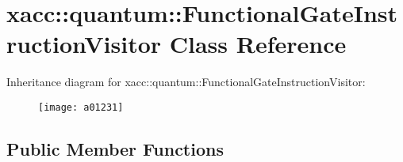 \hypertarget{a01231}{}\section{xacc\+:\+:quantum\+:\+:Functional\+Gate\+Instruction\+Visitor Class Reference}
\label{a01231}
Inheritance diagram for xacc\+:\+:quantum\+:\+:Functional\+Gate\+Instruction\+Visitor\+:\begin{figure}[H]
\begin{center}
\leavevmode
\texttt{[image: a01231]}
\end{center}
\end{figure}
\subsection*{Public Member Functions}
